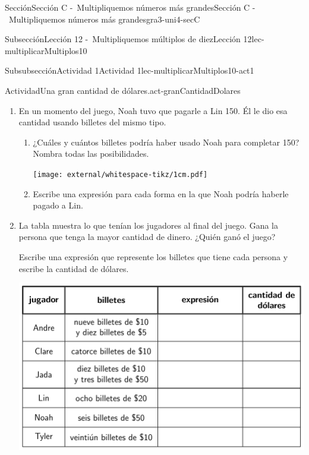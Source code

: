 \begin{sectionptx}{Sección}{Sección C -~Multipliquemos números más grandes}{}{Sección C -~Multipliquemos números más grandes}{}{}{gra3-uni4-secC}
\begin{subsectionptx}{Subsección}{Lección 12 -~Multipliquemos múltiplos de diez}{}{Lección 12}{}{}{lec-multiplicarMultiplos10}
\begin{subsubsectionptx}{Subsubsección}{Actividad 1}{}{Actividad 1}{}{}{lec-multiplicarMultiplos10-act1}
\begin{activity}{Actividad}{Una gran cantidad de dólares.}{act-granCantidadDolares}
\begin{enumerate}
\item{}En un momento del juego, Noah tuvo que pagarle a Lin \textdollar{}150. Él le dio esa cantidad usando billetes del mismo tipo.%
%
\begin{enumerate}
\item{}¿Cuáles y cuántos billetes podría haber usado Noah para completar \textdollar{}150? Nombra todas las posibilidades.%
\begin{image}{0}{1}{0}{}%
\texttt{[image: external/whitespace-tikz/1cm.pdf]}
\end{image}%
\item{}Escribe una expresión para cada forma en la que Noah podría haberle pagado a Lin.%
\end{enumerate}
\clearpage
\item{}La tabla muestra lo que tenían los jugadores al final del juego. Gana la persona que tenga la mayor cantidad de dinero. ¿Quién ganó el juego?%
\par
Escribe una expresión que represente los billetes que tiene cada persona y escribe la cantidad de dólares.%
\begin{image}{0}{1}{0}{}%
\includegraphics[max width=\linewidth, center]{external/tikz-source/unaGranCantidadDeDolares-tab2.pdf}
\end{image}%
\end{enumerate}
\end{activity}%
\end{subsubsectionptx}
%
%
\typeout{************************************************}
\typeout{************************************************}

\end{subsectionptx}
\end{sectionptx}
